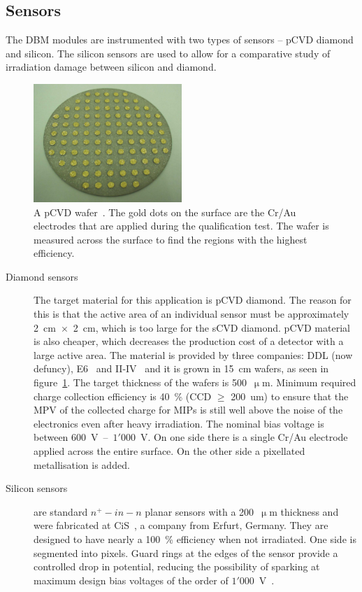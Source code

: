 \subsection{Sensors}
The DBM modules are instrumented with two types of sensors -- pCVD diamond and silicon. The silicon sensors are used to allow for a comparative study of irradiation damage between silicon and diamond.
\begin{figure}[!t]
\centering
\includegraphics[width=0.5\textwidth]{04_charge_monitoring/pics/wafer}
\caption{A pCVD wafer~\cite{RADSEN:00001}. The gold dots on the surface are the Cr/Au electrodes that are applied during the qualification test. The wafer is measured across the surface to find the regions with the highest efficiency.}
\label{fig:wafer}
\end{figure}

\begin{description}
\item[Diamond sensors] The target material for this application is pCVD diamond. The reason for this is that the active area of an individual sensor must be approximately 2~cm~$\times$~2~cm, which is too large for the sCVD diamond. pCVD material is also cheaper, which decreases the production cost of a detector with a large active area. The material is provided by three companies: DDL (now defuncy), E6~\cite{E6:00000} and II-IV~\cite{II-IV:00000} and it is grown in 15~cm wafers, as seen in figure~\ref{fig:wafer}. The target thickness of the wafers is 500~$\upmu$m. Minimum required charge collection efficiency is 40~\% (CCD $\geq$ 200~um) to ensure that the MPV of the collected charge for MIPs is still well above the noise of the electronics even after heavy irradiation. The nominal bias voltage is between 600~V~--~$1'000$~V. On one side there is a single Cr/Au electrode applied across the entire surface. On the other side a pixellated metallisation is added. 
\item[Silicon sensors] are standard $n^+ - in - n$ planar sensors with a 200~$\upmu$m thickness and were fabricated at CiS~\cite{CIS:00000}, a company from Erfurt, Germany. They are designed to have nearly a 100~\% efficiency when not irradiated. 
One side is segmented into pixels. Guard rings at the edges of the sensor provide a controlled drop in potential, reducing the possibility of sparking at maximum design bias voltages of the order of $1'000$~V~\cite{1748-0221-7-11-P11010,Dopke:1560823}.
\end{description}




